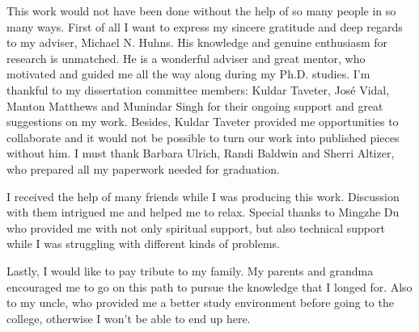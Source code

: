 This work would not have been done without the help of so many people in so many ways. First of all I want to express my sincere gratitude and deep regards to my adviser, Michael N. Huhns. His knowledge and genuine enthusiasm for research is unmatched. He is a wonderful adviser and great mentor, who motivated and guided me all the way along during my Ph.D. studies. I'm thankful to my dissertation committee members: Kuldar Taveter, Jos{\'e} Vidal, Manton Matthews and Munindar Singh for their ongoing support and great suggestions on my work. Besides, Kuldar Taveter provided me opportunities to collaborate and it would not be possible to turn our work into published pieces without him. I must thank Barbara Ulrich, Randi Baldwin and Sherri Altizer, who prepared all my paperwork needed for graduation.

I received the help of many friends while I was producing this work. Discussion with them intrigued me and helped me to relax. Special thanks to Mingzhe Du who provided me with not only spiritual support, but also technical support while I was struggling with different kinds of problems.  

Lastly, I would like to pay tribute to my family. My parents and grandma encouraged me to go on this path to pursue the knowledge that I longed for. Also to my uncle, who provided me a better study environment before going to the college, otherwise I won't be able to end up here.

